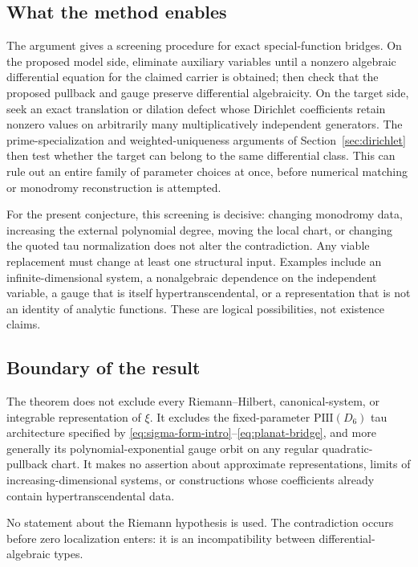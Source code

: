 \documentclass[11pt]{article}
\numberwithin{equation}{section}
\theoremstyle{definition}
\theoremstyle{remark}
\begin{document}
\subsection{What the method enables}

The argument gives a screening procedure for exact special-function bridges.  On the proposed
model side, eliminate auxiliary variables until a nonzero algebraic differential equation for the
claimed carrier is obtained; then check that the proposed pullback and gauge preserve differential
algebraicity.  On the target side, seek an exact translation or dilation defect whose Dirichlet
coefficients retain nonzero values on arbitrarily many multiplicatively independent generators.
The prime-specialization and weighted-uniqueness arguments of
Section~\ref{sec:dirichlet} then test whether the target can belong to the same differential class.
This can rule out an entire family of parameter choices at once, before numerical matching or
monodromy reconstruction is attempted.

For the present conjecture, this screening is decisive: changing monodromy data, increasing the
external polynomial degree, moving the local chart, or changing the quoted tau normalization does
not alter the contradiction.  Any viable replacement must change at least one structural input.
Examples include an infinite-dimensional system, a nonalgebraic dependence on the independent
variable, a gauge that is itself hypertranscendental, or a representation that is not an identity
of analytic functions.  These are logical possibilities, not existence claims.

\subsection{Boundary of the result}

The theorem does not exclude every Riemann--Hilbert, canonical-system, or integrable representation
of $\xi$.  It excludes the fixed-parameter $\mathrm{PIII}(D_6)$ tau architecture specified by
\eqref{eq:sigma-form-intro}--\eqref{eq:planat-bridge}, and more generally its polynomial-exponential
gauge orbit on any regular quadratic-pullback chart.  It makes no assertion about approximate
representations, limits of increasing-dimensional systems, or constructions whose coefficients
already contain hypertranscendental data.

No statement about the Riemann hypothesis is used.  The contradiction occurs before zero
localization enters: it is an incompatibility between differential-algebraic types.
\end{document}

